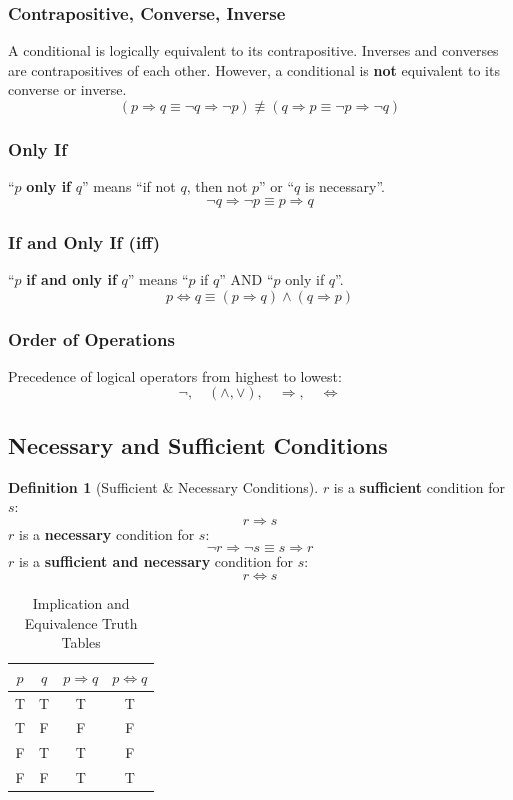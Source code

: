 \documentclass{article}
\theoremstyle{plain}
\theoremstyle{definition}
\newtheorem*{definition}{Definition}
\theoremstyle{remark}
\begin{document}
\subsubsection{Contrapositive, Converse, Inverse}
A conditional is logically equivalent to its contrapositive. Inverses and converses are contrapositives of each other. However, a conditional is \textbf{not} equivalent to its converse or inverse.
\[
    (p \Rightarrow q \equiv \neg q \Rightarrow \neg p) \not\equiv (q \Rightarrow p \equiv \neg p \Rightarrow \neg q)
\]

\subsubsection{Only If}
``$p$ \textbf{only if} $q$'' means ``if not $q$, then not $p$'' or ``$q$ is necessary''.
\[
    \neg q \Rightarrow \neg p \equiv p \Rightarrow q
\]

\subsubsection{If and Only If (iff)}
``$p$ \textbf{if and only if} $q$'' means ``$p$ if $q$'' AND ``$p$ only if $q$''.
\[
    p \Leftrightarrow q \equiv (p \Rightarrow q) \wedge (q \Rightarrow p)
\]

\subsubsection{Order of Operations}
Precedence of logical operators from highest to lowest:
\[
    \neg, \quad (\wedge, \vee), \quad \Rightarrow, \quad \Leftrightarrow
\]

\subsection{Necessary and Sufficient Conditions}

\begin{definition}[Sufficient \& Necessary Conditions]
$r$ is a \textbf{sufficient} condition for $s$:
\[ r \Rightarrow s \]
$r$ is a \textbf{necessary} condition for $s$:
\[ \neg r \Rightarrow \neg s \equiv s \Rightarrow r \]
$r$ is a \textbf{sufficient and necessary} condition for $s$:
\[ r \Leftrightarrow s \] 
\end{definition}

\begin{table}[H]
    \centering
    \begin{tabular}{cc|c|c} 
        \toprule
        $p$ & $q$ & $p \Rightarrow q$ & $p \Leftrightarrow q$ \\ 
        \midrule
        T & T & T & T \\ 
        T & F & F & F \\ 
        F & T & T & F \\ 
        F & F & T & T \\ 
        \bottomrule
    \end{tabular}
    \caption{Implication and Equivalence Truth Tables}
    \label{tab:impliesTT}
\end{table}
\end{document}
